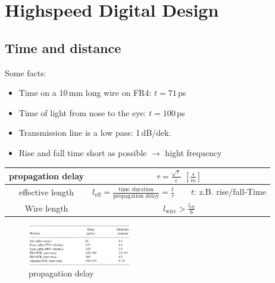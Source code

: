 \section{Highspeed Digital Design}
\subsection{Time and distance}
Some facts:
\begin{itemize}
	\item Time on a 10\,mm long wire on FR4:  \qquad $t=71$\,ps
	\item Time of light from nose to the eye: \qquad $t=100$\,ps
	\item Transmission line is a low pass: 1\,dB/dek.
	\item Rise and fall time short as possible $\rightarrow$ hight frequency
\end{itemize}

\begin{table}[!h]
	\centering
	\begin{tabular}{|c|c|}
		\hline
		propagation delay &                                $\tau = \frac{\sqrt{\varepsilon}}{c}$ \quad $[\frac{s}{m}]$                                \\ \hline
		effective length  & $ l_{\text{eff}} = \frac{\text{time duration}}{\text{propagation delay}} = \frac{t}{\tau} \qquad t:$\,z.B. rise/fall-Time \\ \hline
		   Wire length    &                                       $l_{\text{wire}} > \frac{l_{\text{eff}}}{6}$                                        \\ \hline
	\end{tabular}
\end{table}

\begin{figure}[h]
	\centering
	\includegraphics[width=0.4\textwidth]{images/High_Speed_Digital/propDelay.jpg}
	\caption{propagation delay}
\end{figure}

